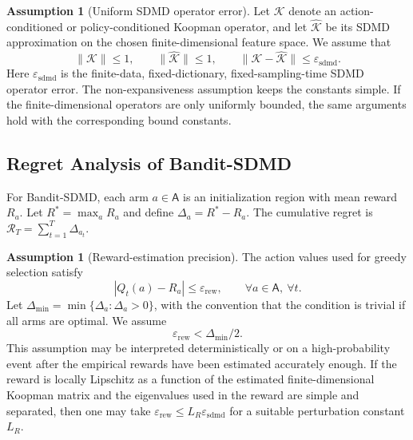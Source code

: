 \documentclass{article}
\numberwithin{equation}{section}
\theoremstyle{definition}
\newtheorem{assumption}[theorem]{Assumption}
\begin{document}
\begin{assumption}[Uniform SDMD operator error]\label{ass:sdmd_error}
Let $\mathcal{K}$ denote an action-conditioned or policy-conditioned Koopman operator, and let $\widehat{\mathcal{K}}$ be its SDMD approximation on the chosen finite-dimensional feature space. We assume that
\begin{equation*}
    \|\mathcal{K}\|\le1,
    \qquad
    \|\widehat{\mathcal{K}}\|\le1,
    \qquad
    \|\mathcal{K}-\widehat{\mathcal{K}}\|\le\varepsilon_{\mathrm{sdmd}}.
\end{equation*}
Here $\varepsilon_{\mathrm{sdmd}}$ is the finite-data, fixed-dictionary, fixed-sampling-time SDMD operator error. The non-expansiveness assumption keeps the constants simple. If the finite-dimensional operators are only uniformly bounded, the same arguments hold with the corresponding bound constants.
\end{assumption}

\subsection{Regret Analysis of Bandit-SDMD}
For Bandit-SDMD, each arm $a\in\mathsf{A}$ is an initialization region with mean reward $R_a$. Let $R^*=\max_a R_a$ and define $\Delta_a=R^*-R_a$. The cumulative regret is $\mathcal{R}_T=\sum_{t=1}^T\Delta_{a_t}$.

\begin{assumption}[Reward-estimation precision]\label{ass:sdmd_precision}
The action values used for greedy selection satisfy
\begin{equation*}
|Q_t(a)-R_a|\le \varepsilon_{\mathrm{rew}},
\qquad \forall a\in\mathsf{A},\ \forall t.
\end{equation*}
Let $\Delta_{\min}=\min\{\Delta_a:\Delta_a>0\}$, with the convention that the condition is trivial if all arms are optimal. We assume
\begin{equation*}
    \varepsilon_{\mathrm{rew}}<\Delta_{\min}/2.
\end{equation*}
This assumption may be interpreted deterministically or on a high-probability event after the empirical rewards have been estimated accurately enough. If the reward is locally Lipschitz as a function of the estimated finite-dimensional Koopman matrix and the eigenvalues used in the reward are simple and separated, then one may take $\varepsilon_{\mathrm{rew}}\le L_R\varepsilon_{\mathrm{sdmd}}$ for a suitable perturbation constant $L_R$.
\end{assumption}
\end{document}
